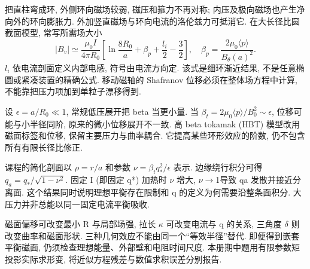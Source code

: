 \label{ch:highbeta}
把直柱弯成环, 外侧环向磁场较弱, 磁压和箍力不再对称; 内压及极向磁场也产生净向外的环向膨胀力. 外加竖直磁场与环向电流的洛伦兹力可抵消它. 在大长径比圆截面模型, 常写所需场大小
\begin{equation}
 |B_v|\simeq\frac{\mu_0I}{4\pi R_0}
 \left[\ln\frac{8R_0}a+\beta_p+\frac{l_i}2-\frac32\right],
 \quad \beta_p=\frac{2\mu_0\langle p\rangle}{B_\theta(a)^2}.
\end{equation}
$l_i$ 依电流剖面定义内部电感, 符号由电流方向定. 该式是细环渐近结果, 不是任意椭圆或紧凑装置的精确公式. 移动磁轴的 Shafranov 位移必须在整体场方程中计算, 不能靠把压力项加到单粒子漂移得到.

设 $\epsilon=a/R_0\ll1$, 常规低压展开把 beta 当更小量. 当 $\beta_t=2\mu_0\langle p\rangle/B_0^2\sim\epsilon$, 位移可能与小半径同阶, 原来的微小位移展开不一致. 高 beta tokamak (HBT) 模型改用磁面标签和位移, 保留主要压力与曲率耦合. 它提高某些环形效应的阶数, 仍不包含所有有限长径比修正.

课程的简化剖面以 $\rho=r/a$ 和参数 $\nu=\beta_tq_*^2/\epsilon$ 表示. 边缘绕行积分可得 $q_a=q_*/\sqrt{1-\nu^2}$. 固定 I (即固定 q*) 加热时 \ensuremath{\nu} 增大, \ensuremath{\nu}\ensuremath{\to}1导致 qa 发散并接近分离面. 这个结果同时说明理想平衡存在限制和 q 的定义为何需要沿整条面积分. 大压力并非总能以同一固定电流平衡吸收.

磁面偏移可改变最小 R 与局部场强, 拉长 \ensuremath{\kappa} 可改变电流与 q 的关系, 三角度 \ensuremath{\delta} 则改变曲率和磁面形状. 三种几何效应不能由同一个``等效半径''替代. 即便得到嵌套平衡磁面, 仍须检查理想能量、外部壁和电阻时间尺度. 本册期中题用有限参数矩投影实际求形变, 将近似方程残差与数值求积误差分别报告.
